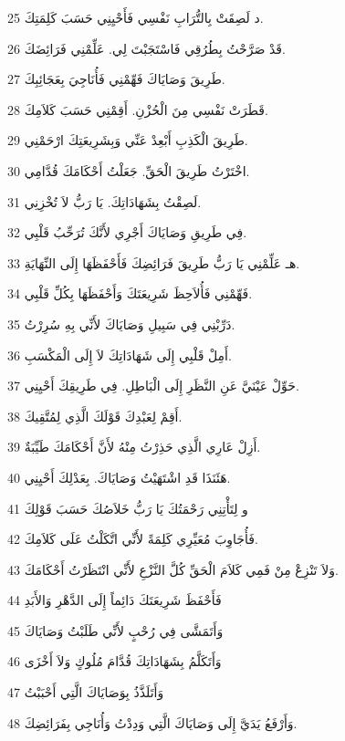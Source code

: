 \par 25 د لَصِقَتْ بِالتُّرَابِ نَفْسِي فَأَحْيِنِي حَسَبَ كَلِمَتِكَ.
\par 26 قَدْ صَرَّحْتُ بِطُرُقِي فَاسْتَجَبْتَ لِي. عَلِّمْنِي فَرَائِضَكَ.
\par 27 طَرِيقَ وَصَايَاكَ فَهِّمْنِي فَأُنَاجِيَ بِعَجَائِبِكَ.
\par 28 قَطَرَتْ نَفْسِي مِنَ الْحُزْنِ. أَقِمْنِي حَسَبَ كَلاَمِكَ.
\par 29 طَرِيقَ الْكَذِبِ أَبْعِدْ عَنِّي وَبِشَرِيعَتِكَ ارْحَمْنِي.
\par 30 اخْتَرْتُ طَرِيقَ الْحَقِّ. جَعَلْتُ أَحْكَامَكَ قُدَّامِي.
\par 31 لَصِقْتُ بِشَهَادَاتِكَ. يَا رَبُّ لاَ تُخْزِنِي.
\par 32 فِي طَرِيقِ وَصَايَاكَ أَجْرِي لأَنَّكَ تُرَحِّبُ قَلْبِي.
\par 33 هـ عَلِّمْنِي يَا رَبُّ طَرِيقَ فَرَائِضِكَ فَأَحْفَظَهَا إِلَى النِّهَايَةِ.
\par 34 فَهِّمْنِي فَأُلاَحِظَ شَرِيعَتَكَ وَأَحْفَظَهَا بِكُلِّ قَلْبِي.
\par 35 دَرِّبْنِي فِي سَبِيلِ وَصَايَاكَ لأَنِّي بِهِ سُرِرْتُ.
\par 36 أَمِلْ قَلْبِي إِلَى شَهَادَاتِكَ لاَ إِلَى الْمَكْسَبِ.
\par 37 حَوِّلْ عَيْنَيَّ عَنِ النَّظَرِ إِلَى الْبَاطِلِ. فِي طَرِيقِكَ أَحْيِنِي.
\par 38 أَقِمْ لِعَبْدِكَ قَوْلَكَ الَّذِي لِمُتَّقِيكَ.
\par 39 أَزِلْ عَارِي الَّذِي حَذِرْتُ مِنْهُ لأَنَّ أَحْكَامَكَ طَيِّبَةٌ.
\par 40 هَئَنَذَا قَدِ اشْتَهَيْتُ وَصَايَاكَ. بِعَدْلِكَ أَحْيِنِي.
\par 41 و لِتَأْتِنِي رَحْمَتُكَ يَا رَبُّ خَلاَصُكَ حَسَبَ قَوْلِكَ
\par 42 فَأُجَاوِبَ مُعَيِّرِي كَلِمَةً لأَنِّي اتَّكَلْتُ عَلَى كَلاَمِكَ.
\par 43 وَلاَ تَنْزِعْ مِنْ فَمِي كَلاَمَ الْحَقِّ كُلَّ النَّزْعِ لأَنِّي انْتَظَرْتُ أَحْكَامَكَ.
\par 44 فَأَحْفَظَ شَرِيعَتَكَ دَائِماً إِلَى الدَّهْرِ وَالأَبَدِ
\par 45 وَأَتَمَشَّى فِي رُحْبٍ لأَنِّي طَلَبْتُ وَصَايَاكَ
\par 46 وَأَتَكَلَّمُ بِشَهَادَاتِكَ قُدَّامَ مُلُوكٍ وَلاَ أَخْزَى
\par 47 وَأَتَلَذَّذُ بِوَصَايَاكَ الَّتِي أَحْبَبْتُ
\par 48 وَأَرْفَعُ يَدَيَّ إِلَى وَصَايَاكَ الَّتِي وَدِدْتُ وَأُنَاجِي بِفَرَائِضِكَ.
